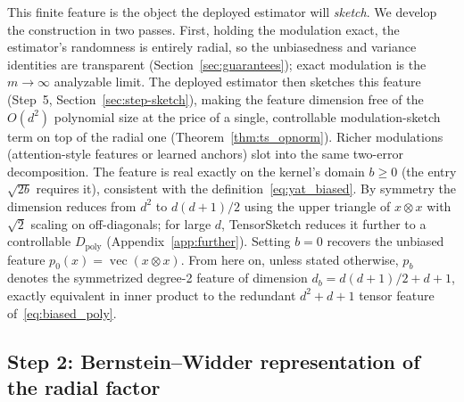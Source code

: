 \documentclass{article}
\DeclareMathOperator{\vecc}{vec}
\begin{document}
This finite feature is the object the deployed estimator will \emph{sketch}. We develop the construction in two passes. First, holding the modulation exact, the estimator's randomness is entirely radial, so the unbiasedness and variance identities are transparent (Section~\ref{sec:guarantees}); exact modulation is the $m\to\infty$ analyzable limit. The deployed estimator then sketches this feature (Step~5, Section~\ref{sec:step-sketch}), making the feature dimension free of the $O(d^2)$ polynomial size at the price of a single, controllable modulation-sketch term on top of the radial one (Theorem~\ref{thm:ts_opnorm}). Richer modulations (attention-style features or learned anchors) slot into the same two-error decomposition. The feature is real exactly on the kernel's domain $b\ge0$ (the entry $\sqrt{2b}$ requires it), consistent with the definition~\eqref{eq:yat_biased}. By symmetry the dimension reduces from $d^2$ to $d(d+1)/2$ using the upper triangle of $x\otimes x$ with $\sqrt2$ scaling on off-diagonals; for large $d$, TensorSketch \citep{pham2013fast} reduces it further to a controllable $D_{\mathrm{poly}}$ (Appendix~\ref{app:further}). Setting $b=0$ recovers the unbiased feature $p_0(x)=\vecc(x\otimes x)$. From here on, unless stated otherwise, $p_b$ denotes the symmetrized degree-2 feature of dimension $d_b=d(d+1)/2+d+1$, exactly equivalent in inner product to the redundant $d^2+d+1$ tensor feature of~\eqref{eq:biased_poly}.

\subsection{Step 2: Bernstein--Widder representation of the radial factor}
\label{sec:step-bernstein}
\end{document}
